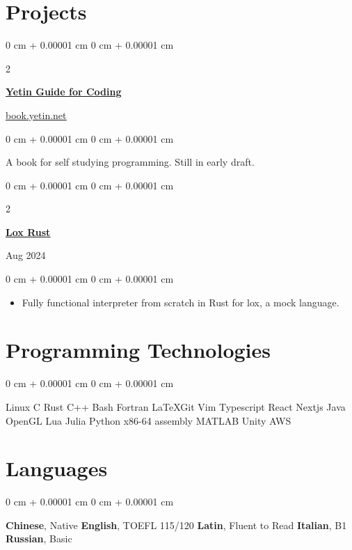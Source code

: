 \documentclass[10pt, letterpaper]{article}
\newenvironment{highlights}{
    \begin{itemize}[
        topsep=0.10 cm,
        parsep=0.10 cm,
        partopsep=0pt,
        itemsep=0pt,
        leftmargin=0 cm + 10pt
    ]
}{
    \end{itemize}
} %
\newenvironment{onecolentry}{
    \begin{adjustwidth}{
        0 cm + 0.00001 cm
    }{
        0 cm + 0.00001 cm
    }
}{
    \end{adjustwidth}
} %
\newenvironment{twocolentry}[2][]{
    \onecolentry
    \def\secondColumn{#2}
    \setcolumnwidth{\fill, 4.5 cm}
    \begin{paracol}{2}
}{
    \switchcolumn \raggedleft \secondColumn
    \end{paracol}
    \endonecolentry
} %
\begin{document}
    
    \section{Projects}

        \begin{twocolentry}{
				\href{https://book.yetin.net}{\underline{book.yetin.net}}
        }
		\href{https://book.yetin.net}{\underline{\textbf{Yetin Guide for Coding}}}
		\end{twocolentry}
        \vspace{0.10 cm}
        \begin{onecolentry}
			A book for self studying programming. Still in early  draft.
        \end{onecolentry}
        \vspace{0.2 cm}

        \begin{twocolentry}{
            Aug 2024
		}
		\href{https://github.com/harryhanYuhao/lox-rust.git}{\underline{\textbf{Lox Rust}}}
		\end{twocolentry}
        \vspace{0.10 cm}
        \begin{onecolentry}
            \begin{highlights}
                \item Fully functional interpreter from scratch in Rust for lox, a mock language.
            \end{highlights}
        \end{onecolentry}


	\section{Programming Technologies}
        \begin{onecolentry}
			Linux \textbullet{} C \textbullet{} Rust \textbullet{} C++ \textbullet{} Bash \textbullet{} Fortran \textbullet{} \LaTeX \textbullet Git \textbullet Vim \textbullet Typescript \textbullet React \textbullet Nextjs \textbullet Java
			OpenGL \textbullet Lua \textbullet{} Julia \textbullet Python \textbullet{} x86-64 assembly \textbullet{} MATLAB \textbullet{} Unity \textbullet AWS

        \end{onecolentry}

        \vspace{0.2 cm}

	\section{Languages}
	\begin{onecolentry}
		\textbf{Chinese}, Native
		\textbullet{} 
		\textbf{English}, TOEFL 115/120 
		\textbullet{} 
		\textbf{Latin}, Fluent to Read
		\textbullet{} 
		\textbf{Italian}, B1
		\textbullet{}
		\textbf{Russian}, Basic 
	\end{onecolentry}
\end{document}
